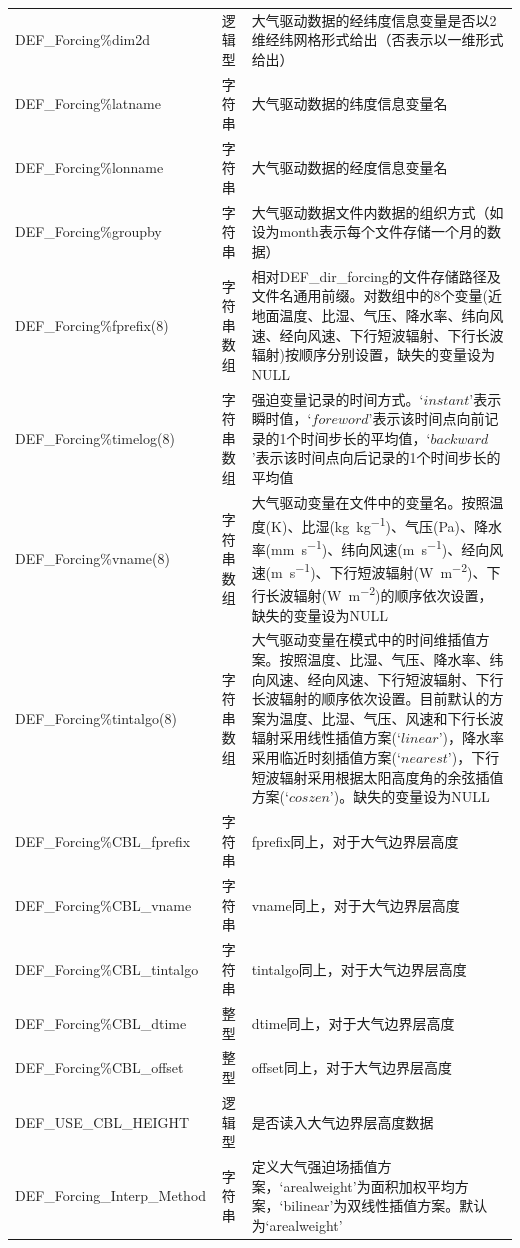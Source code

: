 \documentclass[a4paper,12pt,twoside]{article}
\begin{document}
{\begin{longtable}[!htbp]{lcp{}}
DEF\_Forcing\%dim2d & 逻辑型 & 大气驱动数据的经纬度信息变量是否以2维经纬网格形式给出（否表示以一维形式给出） \\
DEF\_Forcing\%latname & 字符串 & 大气驱动数据的纬度信息变量名 \\
DEF\_Forcing\%lonname & 字符串 & 大气驱动数据的经度信息变量名 \\
DEF\_Forcing\%groupby & 字符串 & 大气驱动数据文件内数据的组织方式（如设为month表示每个文件存储一个月的数据） \\
DEF\_Forcing\%fprefix(8) & 字符串数组 & 相对DEF\_dir\_forcing的文件存储路径及文件名通用前缀。对数组中的8个变量(近地面温度、比湿、气压、降水率、纬向风速、经向风速、下行短波辐射、下行长波辐射)按顺序分别设置，缺失的变量设为NULL \\
DEF\_Forcing\%timelog(8) & 字符串数组 & 强迫变量记录的时间方式。`$instant$'表示瞬时值，`$foreword$'表示该时间点向前记录的1个时间步长的平均值，`$backward$'表示该时间点向后记录的1个时间步长的平均值 \\
DEF\_Forcing\%vname(8)  & 字符串数组 & 大气驱动变量在文件中的变量名。按照温度(K)、比湿(\unit{kg.kg^{-1}})、气压(Pa)、降水率(\unit{mm.s^{-1}})、纬向风速(\unit{m.s^{-1}})、经向风速(\unit{m.s^{-1}})、下行短波辐射(\unit{W.m^{-2}})、下行长波辐射(\unit{W.m^{-2}})的顺序依次设置，缺失的变量设为NULL \\
DEF\_Forcing\%tintalgo(8) & 字符串数组 & 大气驱动变量在模式中的时间维插值方案。按照温度、比湿、气压、降水率、纬向风速、经向风速、下行短波辐射、下行长波辐射的顺序依次设置。目前默认的方案为温度、比湿、气压、风速和下行长波辐射采用线性插值方案(`$linear$')，降水率采用临近时刻插值方案(`$nearest$')，下行短波辐射采用根据太阳高度角的余弦插值方案(`$coszen$')。缺失的变量设为NULL \\
DEF\_Forcing\%CBL\_fprefix & 字符串 & fprefix同上，对于大气边界层高度 \\
DEF\_Forcing\%CBL\_vname & 字符串 & vname同上，对于大气边界层高度 \\
DEF\_Forcing\%CBL\_tintalgo & 字符串 & tintalgo同上，对于大气边界层高度 \\
DEF\_Forcing\%CBL\_dtime & 整型 & dtime同上，对于大气边界层高度 \\
DEF\_Forcing\%CBL\_offset & 整型 & offset同上，对于大气边界层高度 \\
DEF\_USE\_CBL\_HEIGHT & 逻辑型 & 是否读入大气边界层高度数据 \\
DEF\_Forcing\_Interp\_Method & 字符串 & 定义大气强迫场插值方案，`arealweight'为面积加权平均方案，`bilinear'为双线性插值方案。默认为`arealweight' \\

\end{longtable}}
\end{document}
